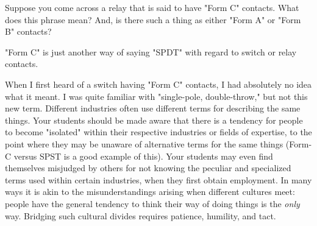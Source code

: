 

Suppose you come across a relay that is said to have "Form C" contacts.  What does this phrase mean?  And, is there such a thing as either "Form A" or "Form B" contacts?







"Form C" is just another way of saying "SPDT" with regard to switch or relay contacts.  







When I first heard of a switch having "Form C" contacts, I had absolutely no idea what it meant.  I was quite familiar with "single-pole, double-throw," but not this new term.  Different industries often use different terms for describing the same things.  Your students should be made aware that there is a tendency for people to become "isolated" within their respective industries or fields of expertise, to the point where they may be unaware of alternative terms for the same things (Form-C versus SPST is a good example of this).  Your students may even find themselves misjudged by others for not knowing the peculiar and specialized terms used within certain industries, when they first obtain employment.  In many ways it is akin to the misunderstandings arising when different cultures meet: people have the general tendency to think their way of doing things is the {\it only} way.  Bridging such cultural divides requires patience, humility, and tact.





